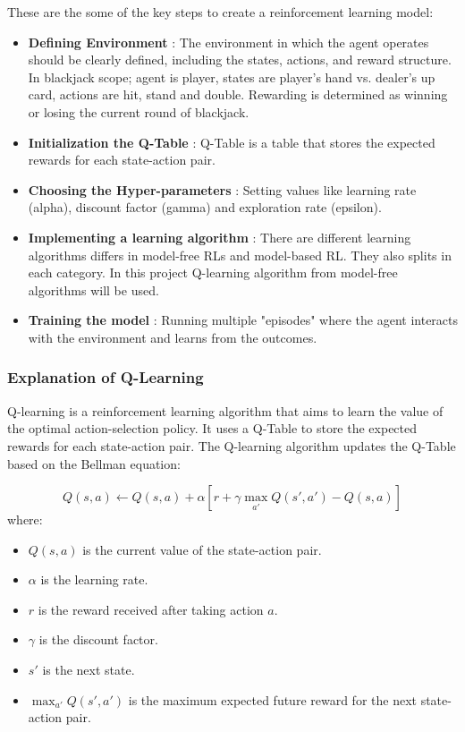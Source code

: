 \documentclass[a4paper,12pt]{report}
\begin{document}
These are the some of the key steps to create a reinforcement learning model:
\begin{itemize}
    \item \textbf{Defining Environment} : The environment in which the agent operates should be clearly defined, including the states, actions, and reward structure. In blackjack scope; agent is player, states are player's hand vs. dealer's up card, actions are hit, stand and double. Rewarding is determined as winning or losing the current round of blackjack.
    \item \textbf{Initialization the Q-Table} : Q-Table is a table that stores the expected rewards for each state-action pair.
    \item \textbf{Choosing the Hyper-parameters} : Setting values like learning rate (alpha), discount factor (gamma) and exploration rate (epsilon).
    \item \textbf{Implementing a learning algorithm} : There are different learning algorithms differs in model-free RLs and model-based RL. They also splits in each category. In this project Q-learning algorithm from model-free algorithms will be used.
    \item \textbf{Training the model} : Running multiple "episodes" where the agent interacts with the environment and learns from the outcomes.
\end{itemize}

\subsubsection{Explanation of Q-Learning}
Q-learning is a reinforcement learning algorithm that aims to learn the value of the optimal action-selection policy. It uses a Q-Table to store the expected rewards for each state-action pair. The Q-learning algorithm updates the Q-Table based on the Bellman equation:

\begin{equation}
Q(s, a) \leftarrow Q(s, a) + \alpha \left[ r + \gamma \max_{a'} Q(s', a') - Q(s, a) \right]
\label{equation:bellman}
\end{equation}
where:
\begin{itemize}
    \item $Q(s, a)$ is the current value of the state-action pair.
    \item $\alpha$ is the learning rate.
    \item $r$ is the reward received after taking action $a$.
    \item $\gamma$ is the discount factor.
    \item $s'$ is the next state.
    \item $\max_{a'} Q(s', a')$ is the maximum expected future reward for the next state-action pair.
\end{itemize}
\end{document}
